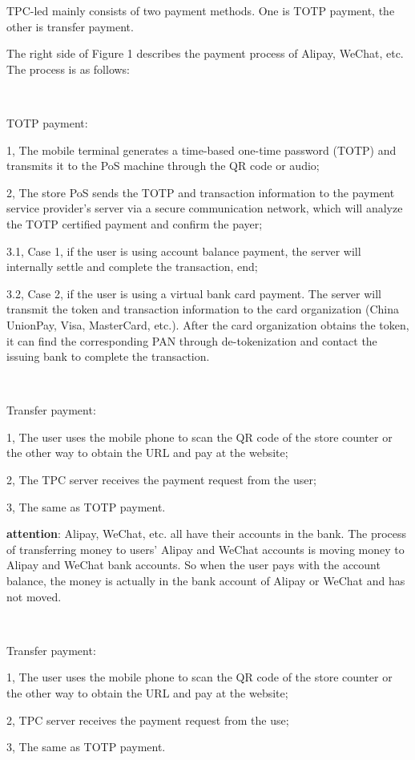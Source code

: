 \documentclass[journal]{IEEEtran}
\begin{document}
TPC-led mainly consists of two payment methods. One is TOTP payment, the other is transfer payment.


The right side of Figure 1 describes the payment process of Alipay, WeChat,  etc. The process is as follows:

\

TOTP payment:

1, The mobile terminal generates a time-based one-time password (TOTP) and transmits it to the PoS machine through the QR code or audio;

2, The store PoS sends the TOTP and transaction information to the payment service provider's server via a secure communication network, which will analyze the TOTP certified payment and confirm the payer;

3.1, Case 1, if the user is using account balance payment, the server will internally settle and complete the transaction, end;

3.2, Case 2, if the user is using a virtual bank card payment. The server will transmit the token and transaction information to the card organization (China UnionPay, Visa, MasterCard, etc.). After the card organization obtains the token, it can find the corresponding PAN through de-tokenization and contact the issuing bank to complete the transaction.

\

Transfer payment:

1, The user uses the mobile phone to scan the QR code of the store counter or the other way to obtain the URL and pay at the website;

2, The TPC server receives the payment request from the user;

3, The same as TOTP payment.

\textbf{attention}: Alipay, WeChat, etc. all have their accounts in the bank. The process of transferring money to users' Alipay and WeChat accounts is moving money to Alipay and WeChat bank accounts. So when the user pays with the account balance, the money is actually in the bank account of Alipay or WeChat and has not moved.

\


Transfer payment:

1, The user uses the mobile phone to scan the QR code of the store counter or the other way to obtain the URL and pay at the website;

2, TPC server receives the payment request from the use;

3, The same as TOTP payment.
\end{document}
